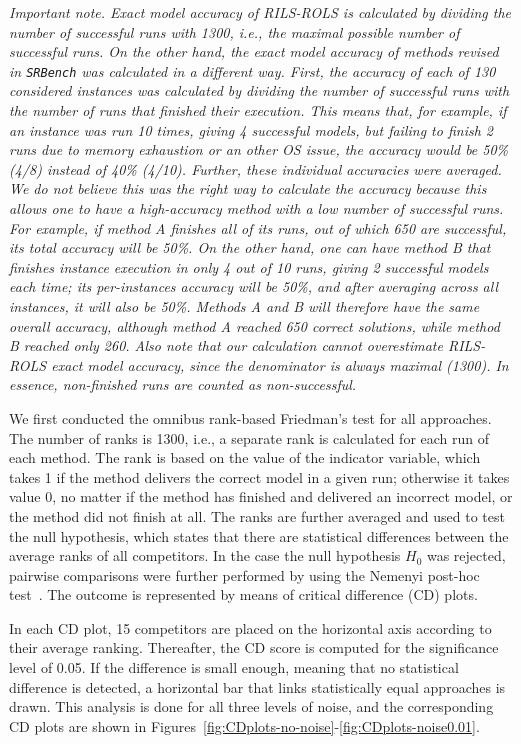 \documentclass{bmcart}
\begin{document}
\emph{Important note. Exact model accuracy of \textsc{RILS-ROLS} is calculated by dividing the number of successful runs with 1300, i.e., the maximal possible number of successful runs. 
On the other hand, the exact model accuracy of methods revised in \texttt{SRBench} was calculated in a different way. First, the accuracy of each of 130 considered instances was calculated by dividing the number of successful runs with the number of runs that finished their execution. This means that, for example, if an instance was run 10 times, giving 4 successful models, but failing to finish 2 runs due to memory exhaustion or an other OS issue, the accuracy would be 50\% (4/8) instead of 40\% (4/10). Further, these individual accuracies were averaged. 
We do not believe this was the right way to calculate the accuracy because this allows one to have a high-accuracy method with a low number of successful runs. For example, if method A finishes all of its runs, out of which 650 are successful, its total accuracy will be 50\%. On the other hand, one can have method B that finishes instance execution in only 4 out of 10 runs, giving 2 successful models each time; its per-instances accuracy will be 50\%, and after averaging across all instances, it will also be 50\%. Methods A and B will therefore have the same overall accuracy, although method A reached 650 correct solutions, while method B reached only 260. Also note that our calculation cannot overestimate \textsc{RILS-ROLS} exact model accuracy, since the denominator is always maximal (1300). In essence, non-finished runs are counted as non-successful.} 

We first conducted the omnibus rank-based Friedman’s test for all approaches. 
The number of ranks is 1300, i.e., a separate rank is calculated for each run of each method. The rank is based on the value of the indicator variable, which takes 1 if the method delivers the correct model in a given run; otherwise it takes value 0, no matter if the method has finished and delivered an incorrect model, or the method did not finish at all. The ranks are further averaged and used to test the null hypothesis, which states that there are statistical differences between the average ranks of all competitors. 
In the case the null hypothesis $H_0$ was rejected, pairwise comparisons were further performed by using the Nemenyi post-hoc test~\cite{pohlert2014pairwise}. The outcome is represented by means of critical difference (CD) plots. 
 
In each CD plot, 15 competitors are placed on the horizontal axis according to their average ranking. Thereafter, the CD score is computed for the significance level of 0.05. If the difference is small enough, meaning that no statistical difference is detected, a horizontal bar that links statistically equal approaches is drawn. This analysis is done for all three levels of noise, and the corresponding CD plots are shown in Figures~\ref{fig:CDplots-no-noise}-\ref{fig:CDplots-noise0.01}.
\end{document}
